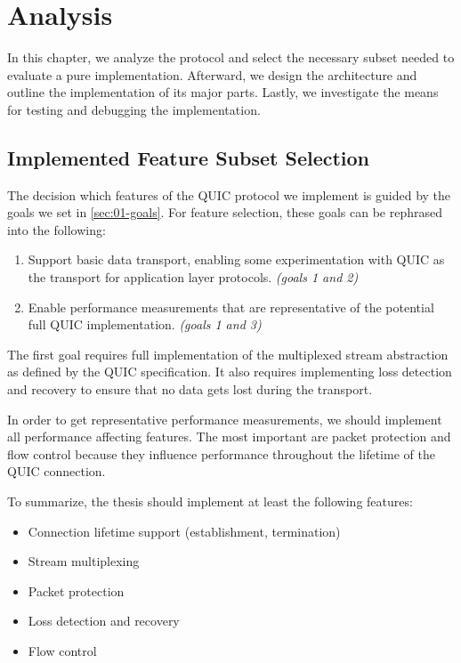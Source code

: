 \chapter{Analysis}\label{chap:03-analysis}

In this chapter, we analyze the protocol and select the necessary subset needed to evaluate a pure
\dotnet{} implementation. Afterward, we design the architecture and outline the implementation of
its major parts. Lastly, we investigate the means for testing and debugging the implementation.

\section{Implemented Feature Subset Selection}

The decision which features of the QUIC protocol we implement is guided by the goals we set in
\autoref{sec:01-goals}. For feature selection, these goals can be rephrased into the following:

\begin{enumerate}

  \item Support basic data transport, enabling some experimentation with QUIC as the transport for
application layer protocols. \textit{(goals 1 and 2)}

  \item Enable performance measurements that are representative of the potential full QUIC
implementation. \textit{(goals 1 and 3)}

\end{enumerate}

The first goal requires full implementation of the multiplexed stream abstraction as defined by the
QUIC specification. It also requires implementing loss detection and recovery to ensure that no data
gets lost during the transport.

In order to get representative performance measurements, we should implement all performance
affecting features. The most important are packet protection and flow control because they influence
performance throughout the lifetime of the QUIC connection.

To summarize, the thesis should implement at least the following features:

\begin{itemize}

    \item Connection lifetime support (establishment, termination)

    \item Stream multiplexing

    \item Packet protection

    \item Loss detection and recovery

    \item Flow control

\end{itemize}

